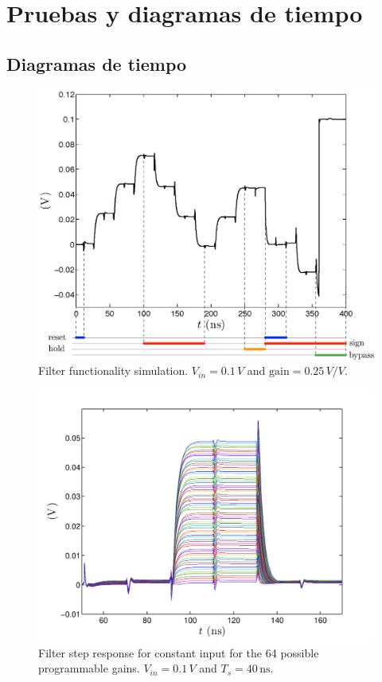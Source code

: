 \section{Pruebas y diagramas de tiempo}





\subsection{Diagramas de tiempo}
\begin{figure}[!t]
	\centering
	\includegraphics[width=5in]{./figures/theorical/test_filter_after_omni.eps}
	\caption{Filter functionality simulation. $V_\textit{in}=0.1\,V$ and $\text{gain}=0.25\,V/V$.}\label{fig:test_filter_after_omni}
\end{figure}

\begin{figure}[!t]
	\centering
	\includegraphics[width=4.4in]{./figures/theorical/gain_curves.pdf}
	\caption[Filter step response for constant input for the 64 possible programmable gains.]{Filter step response for constant input for the 64 possible programmable gains. \mbox{$V_\textit{in}=0.1\,V$} and \mbox{$T_s=40\,\text{ns}$}.}\label{fig:gain_curves}
\end{figure}

